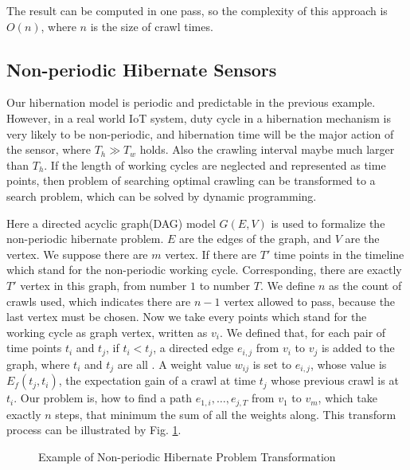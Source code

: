 \documentclass[conference]{IEEEtran}
\begin{document}
The result can be computed in one pass, so the complexity of this approach is $O(n)$, where $n$ is the size of crawl times.

\subsection{Non-periodic Hibernate Sensors}
Our hibernation model is periodic and predictable in the previous example. However, in a real world IoT system, duty cycle in a hibernation mechanism is very likely to be non-periodic, and hibernation time will be the major action of the sensor, where $T_h\gg T_w$ holds. Also the crawling interval maybe much larger than $T_h$. 
If the length of working cycles are neglected and represented as time points, then problem of searching optimal crawling can be transformed to a search problem, which can be solved by dynamic programming.


Here a directed acyclic graph(DAG) model $G(E,V)$ is used to formalize the non-periodic hibernate problem.
$E$ are the edges of the graph, and $V$ are the vertex. We suppose there are $m$ vertex. 
If there are $T'$ time points in the timeline which stand for the non-periodic working cycle. Corresponding, there are exactly $T'$ vertex in this graph, from number $1$ to number $T$. 
We define $n$ as the count of crawls used, which indicates there are $n-1$ vertex allowed to pass, because the last vertex must be chosen. 
Now we take every points which stand for the working cycle as graph vertex, written as $v_i$. We defined that, for each pair of time points $t_i$ and $t_j$, if $t_i<t_j$, a directed edge $e_{i,j}$ from $v_i$ to $v_j$ is added to the graph, where $t_i$ and $t_j$ are all . A weight value $w_{ij}$ is set to $e_{i,j}$, whose value is $E_f(t_j, t_i)$, the expectation gain of a crawl at time $t_j$ whose previous crawl is at $t_i$.
Our problem is, how to find a path $e_{1,i},\ldots,e_{j,T}$ from $v_1$ to $v_m$, which take exactly $n$ steps, that minimum the sum of all the weights along. This transform process can be illustrated by Fig. \ref{fig:problemtrans}.

\begin{figure}
\centering

\captionsetup{justification=centering}
\caption{Example of Non-periodic Hibernate Problem Transformation}
\label{fig:problemtrans}
\end{figure}
\end{document}
